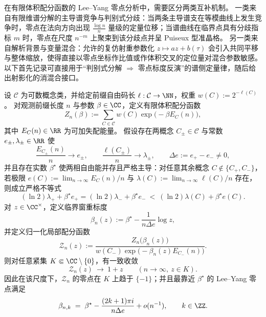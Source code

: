 在有限体积配分函数的 Lee--Yang 零点分析中，需要区分两类互补机制。
一类来自有限维谱分解的主导谱竞争与判别式分歧：当两条主导谱支在等模曲线上发生竞争时，零点在法向方向出现 \(\frac{\log n}{n}\) 量级的定量位移；当谱曲线在临界点具有分歧指标 \(m\) 时，零点在尺度 \(n^{-m}\) 上聚束到该分歧点并呈 Puiseux 型准晶格。
另一类来自解析背景与变量混合：允许的复仿射重参数化 \(z\mapsto az+b(\tau)\) 会引入共同平移与整体缩放，使得直接以零点坐标作比值或作体积交叉的定位量对混合参数敏感。
以下首先记录可直接用于“判别式分解 \(\Rightarrow\) 零点标度反演”的谱侧定量律，随后给出射影化的消混合接口。

\begin{theorem}[两相并存临界窗的尺度极限与零点凝聚]\label{thm:xi-godel-leyang-two-phase-coexistence-window}
设 \(\mathcal C\) 为可数概念类，并给定前缀自由码长 \(\ell:\mathcal C\to\NN\)，权重 \(w(C):=2^{-\ell(C)}\)。
对观测前缀长度 \(n\) 与参数 \(\beta\in\CC\)，定义有限体积配分函数
\[
Z_n(\beta):=\sum_{C\in\mathcal C}w(C)\exp\!\bigl(-\beta E_C(n)\bigr),
\]
其中 \(E_C(n)\in\RR\) 为可加失配能量。
假设存在两概念 \(C_\pm\in\mathcal C\) 与常数 \(e_\pm,\lambda_\pm\in\RR\) 使
\[
\frac{E_{C_\pm}(n)}{n}\to e_\pm,\qquad \frac{\ell(C_\pm)}{n}\to \lambda_\pm,
\qquad
\Delta e:=e_+-e_-\neq 0,
\]
并且存在实数 \(\beta^\star\) 使两相自由能并存且严格主导：对任意其余概念 \(C\notin\{C_+,C_-\}\)，若极限
\(
e(C):=\lim_{n\to\infty}E_C(n)/n
\) 与
\(
\lambda(C):=\lim_{n\to\infty}\ell(C)/n
\)
存在，则成立严格不等式
\[
(\ln 2)\lambda_+ + \beta^\star e_+
=
(\ln 2)\lambda_- + \beta^\star e_-
\ <\ (\ln 2)\lambda(C)+\beta^\star e(C).
\]
对 \(z\in\CC^\times\)，定义临界窗重标度
\[
\beta_{n}(z):=\beta^\star-\frac{1}{n\Delta e}\log z,
\]
并定义归一化局部配分函数
\[
\mathcal Z_n(z):=
\frac{Z_n\!\bigl(\beta_n(z)\bigr)}
{w(C_-)\exp\!\bigl(-\beta_n(z)E_{C_-}(n)\bigr)}.
\]
则对任意紧集 \(K\Subset\CC\setminus\{0\}\)，有一致收敛
\[
\mathcal Z_n(z)\ \longrightarrow\ 1+z
\qquad(n\to\infty,\ z\in K).
\]
因此在该尺度下，\(\mathcal Z_n\) 的零点在 \(K\) 上趋于 \(\{-1\}\)；并且最靠近 \(\beta^\star\) 的 Lee--Yang 零点满足
\[
\beta_{n,k}
\;=\;
\beta^\star-\frac{(2k+1)\pi i}{n\Delta e}+o(n^{-1}),
\qquad k\in\ZZ.
\]
\end{theorem}
